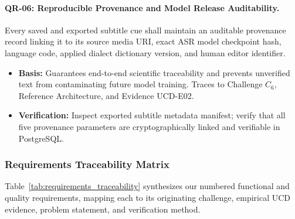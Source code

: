 \documentclass[conference]{IEEEtran}
\begin{document}
\paragraph{QR-06: Reproducible Provenance and Model Release Auditability.}
Every saved and exported subtitle cue shall maintain an auditable provenance record linking it to its source media URI, exact ASR model checkpoint hash, language code, applied dialect dictionary version, and human editor identifier.
\begin{itemize}
    \item \textbf{Basis:} Guarantees end-to-end scientific traceability and prevents unverified text from contaminating future model training. Traces to Challenge $C_6$, Reference Architecture, and Evidence UCD-E02.
    \item \textbf{Verification:} Inspect exported subtitle metadata manifest; verify that all five provenance parameters are cryptographically linked and verifiable in PostgreSQL.
\end{itemize}

\subsubsection{Requirements Traceability Matrix}
\label{sec:design:req:matrix}
Table~\ref{tab:requirements_traceability} synthesizes our numbered functional and quality requirements, mapping each to its originating challenge, empirical UCD evidence, problem statement, and verification method.
\end{document}

